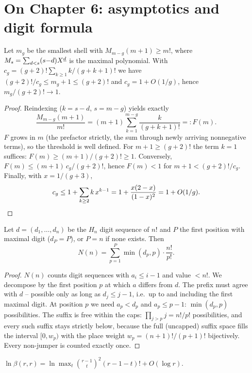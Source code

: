 \section*{On Chapter 6: asymptotics and digit formula}

\begin{satz}
Let $m_g$ be the smallest shell with
$M_{m-g}(m{+}1)\ge m!$, where $M_s=\sum_{d<s}(s{-}d)X^{\underline{d}}$ is the
maximal polynomial. With
$c_g=(g{+}2)!\sum_{k\ge1}k/(g{+}k{+}1)!$ we have
$(g{+}2)!/c_g\le m_g+1\le(g{+}2)!$ and $c_g=1+O(1/g)$, hence
$m_g/(g{+}2)!\to1$.
\end{satz}

\begin{proof}
Reindexing ($k=s{-}d$, $s=m{-}g$) yields exactly
\[
\frac{M_{m-g}(m{+}1)}{m!}
=(m{+}1)\sum_{k=1}^{m-g}\frac{k}{(g{+}k{+}1)!}=:F(m).
\]
$F$ grows in $m$ (the prefactor strictly, the sum through newly
arriving nonnegative terms), so the threshold is well defined.
For $m{+}1\ge(g{+}2)!$ the term $k{=}1$ suffices:
$F(m)\ge(m{+}1)/(g{+}2)!\ge1$. Conversely,
$F(m)\le(m{+}1)\,c_g/(g{+}2)!$, hence $F(m)<1$ for
$m{+}1<(g{+}2)!/c_g$.
Finally, with $x=1/(g{+}3)$,
\[
c_g\le1+\sum_{k\ge2}k\,x^{k-1}
=1+\frac{x(2-x)}{(1-x)^2}=1+O(1/g). \qedhere
\]
\end{proof}

\begin{satz}
Let $d=(d_1,\ldots,d_n)$ be the $H_n$ digit sequence of $n!$ and
$P$ the first position with maximal digit ($d_P=P$), or $P=n$
if none exists. Then
\[
N(n)=\sum_{p=1}^{P}\min(d_p,p)\cdot\frac{n!}{p!}.
\]
\end{satz}

\begin{proof}
$N(n)$ counts digit sequences with $a_i\le i-1$ and value $<n!$.
We decompose by the first position $p$ at which $a$ differs from
$d$. The prefix must agree with $d$ -- possible only as long as
$d_j\le j-1$, i.e.\ up to and including the first maximal digit.
At position $p$ we need $a_p<d_p$ and $a_p\le p-1$:
$\min(d_p,p)$ possibilities. The suffix is free within the caps:
$\prod_{j>p}j=n!/p!$ possibilities, and every such suffix stays
strictly below, because the full (uncapped) suffix space fills
the interval $[0,w_p)$ with the place weight
$w_p=(n{+}1)!/(p{+}1)!$ bijectively. Every non-jumper is counted
exactly once.
\end{proof}

\begin{satz}
$\ln\beta(r,r)=\ln\max_{t}\binom{r-1}{t}^2(r{-}1{-}t)!+O(\log r)$.
\end{satz}

